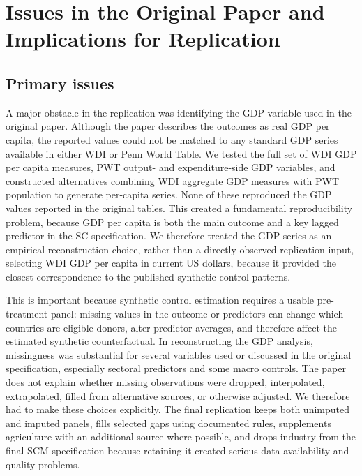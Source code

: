 \documentclass[a4paper]{article}
\begin{document}
\renewcommand{\thesection}{Appendix \Alph{section}:}
\section{Issues in the Original Paper and Implications for Replication} \label{app:replication_issues}


\subsection{Primary issues}

A major obstacle in the replication was identifying the GDP variable used in the original paper. Although the paper describes the outcomes as real GDP per capita, the reported values could not be matched to any standard GDP series available in either WDI or Penn World Table. We tested the full set of WDI GDP per capita measures, PWT output- and expenditure-side GDP variables, and constructed alternatives combining WDI aggregate GDP measures with PWT population to generate per-capita series. None of these reproduced the GDP values reported in the original tables. This created a fundamental reproducibility problem, because GDP per capita is both the main outcome and a key lagged predictor in the SC specification. We therefore treated the GDP series as an empirical reconstruction choice, rather than a directly observed replication input, selecting WDI GDP per capita in current US dollars, because it provided the closest correspondence to the published synthetic control patterns. 

This is important because synthetic control estimation requires a usable pre-treatment panel: missing values in the outcome or predictors can change which countries are eligible donors, alter predictor averages, and therefore affect the estimated synthetic counterfactual. In reconstructing the GDP analysis, missingness was substantial for several variables used or discussed in the original specification, especially sectoral predictors and some macro controls. The paper does not explain whether missing observations were dropped, interpolated, extrapolated, filled from alternative sources, or otherwise adjusted. We therefore had to make these choices explicitly. The final replication keeps both unimputed and imputed panels, fills selected gaps using documented rules, supplements agriculture with an additional source where possible, and drops industry from the final SCM specification because retaining it created serious data-availability and quality problems. 
\end{document}
